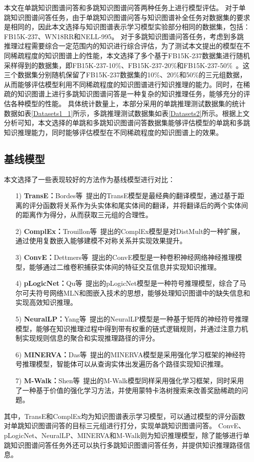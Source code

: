 \documentclass[algorithmlist, AutoFakeBold, AutoFakeSlant, figurelist, tablelist, nomlist, engineering, openany]{seuthesix} %
\begin{document}
本文在单跳知识图谱问答和多跳知识图谱问答两种任务上进行模型评估。
对于单跳知识图谱问答任务，由于单跳知识图谱问答与知识图谱补全任务对数据集的要求是相同的，因此本文选择与知识图谱表示学习模型实验部分相同的数据集，包括：FB15K-237、WN18RR和NELL-995。
对于多跳知识图谱问答任务，考虑到多跳推理过程需要综合一定范围内的知识进行综合评估，为了测试本文提出的模型在不同稀疏程度的知识图谱上的性能，本文选择了多个基于FB15K-237数据集进行随机采样得到的数据集，即FB15K-237-10\%、FB15K-237-20\%和FB15K-237-50\%~\cite{lv2020dynamic}。这三个数据集分别随机保留了FB15K-237数据集的10\%、20\%和50\%的三元组数据，从而能够评估模型利用不同稀疏程度的知识图谱进行知识推理的能力。同时，在稀疏的知识图谱上进行多跳知识图谱问答是一种复杂的知识推理任务，能够充分的评估各种模型的性能。
具体统计数量上，本部分采用的单跳推理测试数据集的统计数据如表\ref{Datasets1_1}所示，多跳推理测试数据集如表\ref{Datasets2}所示。根据上文分析可知，本文选择的单跳和多跳知识图谱问答数据集能够评估模型的单跳和多跳知识推理能力，同时能够评估模型在不同稀疏程度的知识图谱上的效果。

\subsection{基线模型}
本文选择了一些表现较好的方法作为基线模型进行对比：
\begin{itemize}
  \item [1)]\textbf{TransE：}Bordes等~\cite{bordes2013translating}提出的TransE模型是最经典的翻译模型，通过基于距离的评分函数将关系作为头实体和尾实体间的翻译，并将翻译后的两个实体间的距离作为得分，从而获取三元组的合理性。
  \item [2)]\textbf{ComplEx：}Trouillon等~\cite{trouillon2016complex}提出的ComplEx模型是对DistMult的一种扩展，通过使用复数嵌入能够建模不对称关系并实现效果提升。
  \item [3)]\textbf{ConvE：}Dettmers等~\cite{dettmers2018convolutional}提出的ConvE模型是一种卷积神经网络神经推理模型，能够通过二维卷积捕获实体间的特征交互信息并实现知识推理。
  \item [4)]\textbf{pLogicNet：}Qu等~\cite{qu2019probabilistic}提出的pLogicNet模型是一种符号推理模型，综合了马尔可夫符号网络MLN和图嵌入技术的思想，能够处理知识图谱中的缺失信息和实现高效知识推理。
  \item [5)]\textbf{NeuralLP：}Yang等~\cite{yang2017differentiable}提出的NeuralLP模型是一种基于矩阵的神经符号推理模型，能够在知识推理过程中得到带有权重的链式逻辑规则，并通过注意力机制实现规则信息的聚合和实现推理路径的评分。
  \item [6)]\textbf{MINERVA：}Das等~\cite{das2018go}提出的MINERVA模型是采用强化学习框架的神经符号推理模型，智能体可以从查询实体出发遍历各个路径实现知识推理。
  \item [7)]\textbf{M-Walk：}Shen等~\cite{shen2018m}提出的M-Walk模型同样采用强化学习框架，同时采用了一种基于价值的强化学习方法，并使用蒙特卡洛树搜索来改善奖励稀疏的问题。
\end{itemize}
其中，TransE和ComplEx均为知识图谱表示学习模型，可以通过模型的评分函数对单跳知识图谱问答的目标三元组进行打分，实现单跳知识图谱问答。
ConvE、pLogicNet、NeuralLP、MINERVA和M-Walk则为知识推理模型，除了能够进行单跳知识图谱问答任务外还可以执行多跳知识图谱问答任务，并提供知识推理路径信息。
\end{document}
